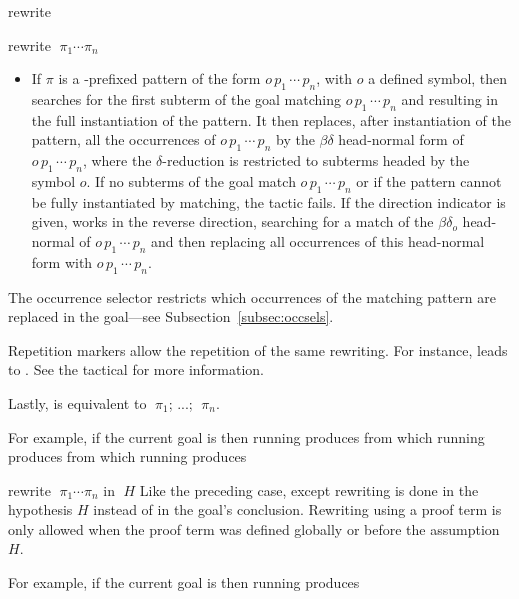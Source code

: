 \begin{tactic}{rewrite}
\begin{tsyntax}{rewrite $\;\pi_1 \cdots \pi_n$}
\begin{itemize}
    \item If $\pi$ is a \ec{/}-prefixed pattern of the form
      $o\,p_1\,\cdots\,p_n$, with $o$ a defined symbol, then
       searches for the first subterm of the goal matching
      $o\,p_1\,\cdots\,p_n$ and resulting in the full instantiation of
      the pattern. It then replaces, after instantiation of the
      pattern, all the occurrences of $o\,p_1\,\cdots\,p_n$ by the
      $\beta\delta$ head-normal form of $o\,p_1\,\cdots\,p_n$, where
      the $\delta$-reduction is restricted to subterms headed by the
      symbol $o$. If no subterms of the goal match
      $o\,p_1\,\cdots\,p_n$
      or if the pattern cannot be fully instantiated by matching, the
      tactic fails. If the direction indicator \ec{-} is given,
       works in the reverse direction, searching for a
      match of the $\beta\delta_o$
      head-normal of $o\,p_1\,\cdots\,p_n$
      and then replacing all occurrences of this head-normal form with
      $o\,p_1\,\cdots\,p_n$.
    \end{itemize}
    
    \smallskip
    The occurrence selector restricts which occurrences of the
    matching pattern are replaced in the goal---see
    Subsection~\ref{subsec:occsels}.

    Repetition markers allow the repetition of the same rewriting. For
    instance,  leads to . See the tactical  for more information.
    
    Lastly,  is equivalent to
     $\;\pi_1$; ...;  $\;\pi_n$.

    \smallskip
    For example, if the current goal is
     then
    running 
    produces 
    from which
    running 
    produces 
    from which
    running 
    produces 
  \end{tsyntax}

  \begin{tsyntax}{rewrite $\;\pi_1 \cdots \pi_n$ in $\;H$} Like the
    preceding case, except rewriting is done in the hypothesis
    $H$ instead of in the goal's conclusion.  Rewriting using a proof
    term is only allowed when the proof term was defined globally
    or before the assumption $H$.

    For example, if the current goal is
     then
    running 
    produces 
  \end{tsyntax}
\end{tactic}
